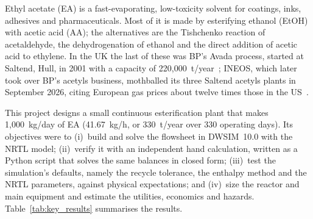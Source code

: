 \documentclass[10pt,a4paper]{article}
\begin{document}
Ethyl acetate (EA) is a fast-evaporating, low-toxicity solvent for coatings, inks, adhesives and pharmaceuticals. Most of it is made by esterifying ethanol (EtOH) with acetic acid (AA); the alternatives are the Tishchenko reaction of acetaldehyde, the dehydrogenation of ethanol and the direct addition of acetic acid to ethylene. In the UK the last of these was BP's Avada process, started at Saltend, Hull, in 2001 with a capacity of 220,000~t/year~\cite{ref1}; INEOS, which later took over BP's acetyls business, mothballed its three Saltend acetyls plants in September 2026, citing European gas prices about twelve times those in the US~\cite{ref2}.

This project designs a small continuous esterification plant that makes 1,000~kg/day of EA (41.67~kg/h, or 330~t/year over 330 operating days). Its objectives were to (i)~build and solve the flowsheet in DWSIM~10.0 with the NRTL model; (ii)~verify it with an independent hand calculation, written as a Python script that solves the same balances in closed form; (iii)~test the simulation's defaults, namely the recycle tolerance, the enthalpy method and the NRTL parameters, against physical expectations; and (iv)~size the reactor and main equipment and estimate the utilities, economics and hazards. Table~\ref{tab:key_results} summarises the results.
\end{document}
